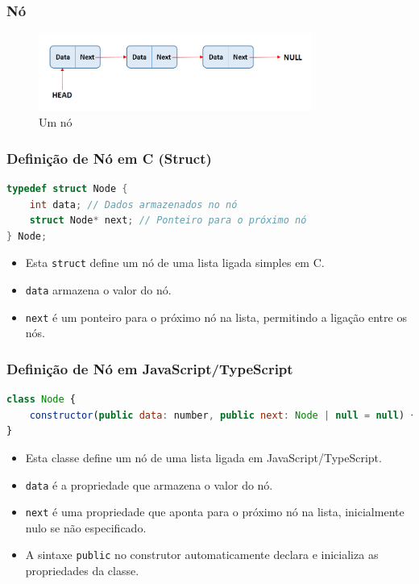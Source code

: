 \begin{frame}[fragile]
  \frametitle{Nó}
  \begin{figure}
    \centering
    \includegraphics[width=0.8\textwidth]{aulas/aula3-lista-ligada1.png}
    \caption{Um nó}
  \end{figure}
\end{frame}

\begin{frame}[fragile]
  \frametitle{Definição de Nó em C (Struct)}
  \begin{lstlisting}[language=C]
typedef struct Node {
    int data; // Dados armazenados no nó
    struct Node* next; // Ponteiro para o próximo nó
} Node;
  \end{lstlisting}
  \begin{itemize}
    \item Esta \texttt{struct} define um nó de uma lista ligada simples em C.
    \item \texttt{data} armazena o valor do nó.
    \item \texttt{next} é um ponteiro para o próximo nó na lista, permitindo a ligação entre os nós.
  \end{itemize}
\end{frame}

\begin{frame}[fragile]
  \frametitle{Definição de Nó em JavaScript/TypeScript}
  \begin{lstlisting}[language=JavaScript]
class Node {
    constructor(public data: number, public next: Node | null = null) {}
}
  \end{lstlisting}
  \begin{itemize}
    \item Esta classe define um nó de uma lista ligada em JavaScript/TypeScript.
    \item \texttt{data} é a propriedade que armazena o valor do nó.
    \item \texttt{next} é uma propriedade que aponta para o próximo nó na lista, inicialmente nulo se não especificado.
    \item A sintaxe \texttt{public} no construtor automaticamente declara e inicializa as propriedades da classe.
  \end{itemize}
\end{frame}

